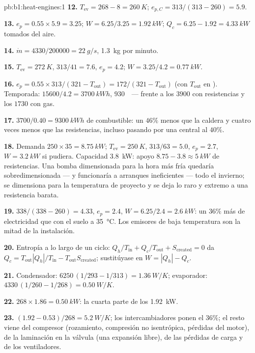 \begin{solution}{pb:b1:heat-engines:1}
\textbf{12.} $T_{\mathrm{ev}} = 268 - 8 = \qty{260}{K}$; $e_{p,C} = 313/(313 - 260)
= 5.9$.

\textbf{13.} $e_p = 0.55 \times 5.9 = 3.25$; $W = 6.25/3.25 = \qty{1.92}{kW}$;
$Q_c = 6.25 - 1.92 = \qty{4.33}{kW}$ tomados del aire.

\textbf{14.} $\dot m = 4330/200000 = \qty{22}{g/s}$, \qty{1.3}{kg} por minuto.

\textbf{15.} $T_{\mathrm{ev}} = \qty{272}{K}$, $313/41 = 7.6$, $e_p = 4.2$;
$W = 3.25/4.2 = \qty{0.77}{kW}$.

\textbf{16.} $e_p = 0.55 \times 313/(321 - T_{\mathrm{out}}) = 172/(321 -
T_{\mathrm{out}})$ (con $T_{\mathrm{out}}$ en ). Temporada: $15600/4.2 =
\qty{3700}{kW h}$, $930$~\texteuro\ --- frente a los $3900$ con resistencias y
los $1730$ con gas.

\textbf{17.} $3700/0.40 = \qty{9300}{kW h}$ de combustible: un $46\%$ menos que la
caldera y cuatro veces menos que las resistencias, incluso pasando por una
central al $40\%$.

\textbf{18.} Demanda $250 \times 35 = \qty{8.75}{kW}$; $T_{\mathrm{ev}} = \qty{250}{K}$,
$313/63 = 5.0$, $e_p = 2.7$, $W = \qty{3.2}{kW}$ si pudiera. Capacidad
\qty{3.8}{kW}: apoyo $8.75 - 3.8 \approx \qty{5}{kW}$ de resistencias. Una bomba
dimensionada para la hora más fría quedaría sobredimensionada --- y
funcionaría a arranques ineficientes --- todo el invierno; se dimensiona
para la temperatura de proyecto y se deja lo raro y extremo a una resistencia barata.

\textbf{19.} $338/(338 - 260) = 4.33$, $e_p = 2.4$, $W = 6.25/2.4 =
\qty{2.6}{kW}$: un $36\%$ más de electricidad que con el suelo a
\qty{35}{\degreeCelsius}. Los emisores de baja temperatura son la mitad de
la instalación.

\textbf{20.} Entropía a lo largo de un ciclo: $Q_h/T_{\mathrm{in}} + Q_c/T_{\mathrm{out}} +
S_{\mathrm{created}} = 0$ da $Q_c = T_{\mathrm{out}}|Q_h|/T_{\mathrm{in}} -
T_{\mathrm{out}}S_{\mathrm{created}}$; sustitúyase en $W = |Q_h| - Q_c$.

\textbf{21.} Condensador: $6250\,(1/293 - 1/313) = \qty{1.36}{W/K}$; evaporador:
$4330\,(1/260 - 1/268) = \qty{0.50}{W/K}$.

\textbf{22.} $268 \times 1.86 = \qty{0.50}{kW}$: la cuarta parte de los
\qty{1.92}{kW}.

\textbf{23.} $(1.92 - 0.53)/268 = \qty{5.2}{W/K}$; los intercambiadores ponen
el $36\%$; el resto viene del compresor (rozamiento, compresión no
isentrópica, pérdidas del motor), de la laminación en la válvula (una
expansión libre), de las pérdidas de carga y de los ventiladores.


\end{solution}
